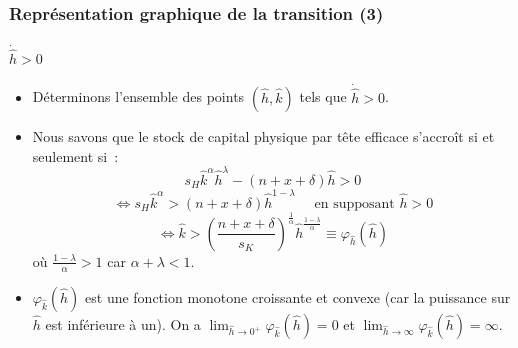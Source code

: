 \documentclass[10pt,notheorems]{beamer}
\theoremstyle{plain}
\theoremstyle{definition} %
\begin{document}
\begin{frame}
  \frametitle{Représentation graphique de la transition (3)}
  \framesubtitle{$\dot{\hat h}>0$}
  \begin{itemize}

  \item Déterminons l'ensemble des points $(\hat h, \hat k)$ tels que $\dot{\hat h}>0$.\newline

  \item Nous savons que le stock de capital physique par tête efficace s'accroît si et seulement si~:
    \[
      s_H\hat k^\alpha \hat h^\lambda - (n+x+\delta) \hat h > 0
    \]
    \[
      \Leftrightarrow s_H \hat k^{\alpha} > (n+x+\delta) \hat h^{1-\lambda} \quad\text{ en supposant }\hat h>0
    \]
    \[
      \Leftrightarrow \hat k > \left(\frac{n+x+\delta}{s_K}\right)^{\frac{1}{\alpha}} \hat h^{\frac{1-\lambda}{\alpha}}\equiv \varphi_{\hat h}(\hat h)
    \]
    où $\frac{1-\lambda}{\alpha}>1$ car $\alpha+\lambda<1$.\newline

  \item $\varphi_{\hat k}(\hat h)$ est une fonction monotone croissante et convexe (car la puissance sur $\hat h$ est inférieure à un). On a $\lim_{\hat h\rightarrow 0^+}\varphi_{\hat k}(\hat h) = 0$ et $\lim_{\hat h\rightarrow \infty}\varphi_{\hat k}(\hat h) = \infty$.\newline

  \end{itemize}

\end{frame}
\end{document}

